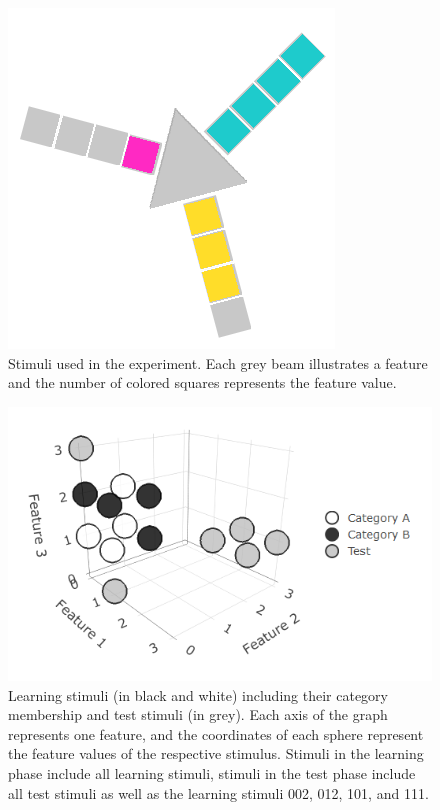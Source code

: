 \documentclass[a4paper,man,natbib]{apa6}
\begin{document}
\begin{figure}[htbp]
\centering
\includegraphics[width = \textwidth]{fig_material.PNG}
\caption{Stimuli used in the experiment. Each grey beam illustrates a feature and the number of colored squares represents the feature value.}
\label{fig:material}
\end{figure}

\begin{figure}[htbp]
\centering
\includegraphics[width = \textwidth]{fig_environment.png}
\caption{Learning stimuli (in black and white) including their category membership and test stimuli (in grey). Each axis of the graph represents one feature, and the coordinates of each sphere represent the feature values of the respective stimulus. Stimuli in the learning phase include all learning stimuli, stimuli in the test phase include all test stimuli as well as the learning stimuli 002, 012, 101, and 111.}
\label{fig:environment}
\end{figure}
\end{document}

